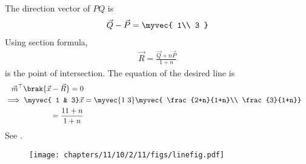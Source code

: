 The direction vector of 
$PQ$ is 
\begin{align}
     \vec{Q
 }-  \vec{P
 }
=
     \myvec{
  1\\
  3
 }
\end{align}
 Using section formula, 
 \begin{align}
	 \vec{R}=\frac{\vec{Q}+n\vec{P}}{1+n}
\end{align}
is the point of intersection.
The 
equation of the desired line  is
\begin{align}
	\vec{m}^{\top}\brak{\vec{x}-\vec{R}}=0
\\
\implies 
	   \myvec{
		   1 &  3}\vec{x}
	   &= \myvec{
  1\ 3}\myvec{
  \frac{2+n}{1+n}\\
  \frac{3}{1+n}} 
  \\
	=	  \frac{11+n}{1+n} 
\end{align}
See
		.
	\begin{figure}[H]
		\centering
 \texttt{[image: chapters/11/10/2/11/figs/linefig.pdf]}
		\caption{}
		\label{fig:11/10/2/11}
  	\end{figure}
